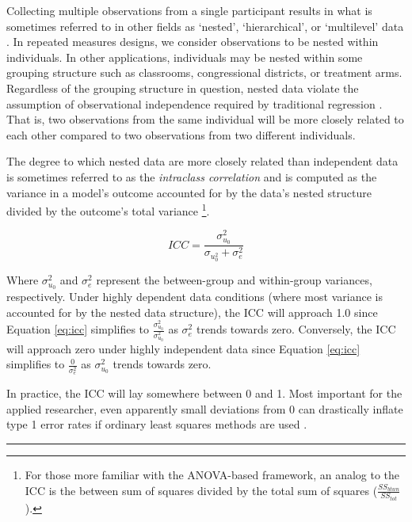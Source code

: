 \documentclass[
]{article}
\begin{document}
Collecting multiple observations from a single participant results in what is sometimes referred to in other fields as `nested', `hierarchical', or `multilevel' data \cite{aarts2014, boisgontier2016, raudenbush2002, schielzeth2013, zuur2009}. In repeated measures designs, we consider observations to be nested within individuals. In other applications, individuals may be nested within some grouping structure such as classrooms, congressional districts, or treatment arms. Regardless of the grouping structure in question, nested data violate the assumption of observational independence required by traditional regression \cite{dehart2019, hox2017, raudenbush2002}. That is, two observations from the same individual will be more closely related to each other compared to two observations from two different individuals.

The degree to which nested data are more closely related than independent data is sometimes referred to as the \emph{intraclass correlation} and is computed as the variance in a model's outcome accounted for by the data's nested structure divided by the outcome's total variance \cite[p.~15]{hox2017}\footnote{For those more familiar with the ANOVA-based framework, an analog to the ICC is the between sum of squares divided by the total sum of squares ($\frac{SS_{btwn}}{SS_{tot}}$).}.

\begin{equation}
ICC=\frac{\sigma_{u_{0}}^{2}}{\sigma_{u_{0}^{2}}+\sigma_{e}^{2}}
\label{eq:icc}
\end{equation}

\noindent
Where \(\sigma_{u_{0}}^{2}\) and \(\sigma_{e}^{2}\) represent the between-group and within-group variances, respectively. Under highly dependent data conditions (where most variance is accounted for by the nested data structure), the ICC will approach 1.0 since Equation \ref{eq:icc} simplifies to \(\frac{\sigma_{u_{0}}^{2}}{\sigma_{u_{0}}^{2}}\) as \(\sigma_{e}^{2}\) trends towards zero. Conversely, the ICC will approach zero under highly independent data since Equation \ref{eq:icc} simplifies to \(\frac{0}{\sigma_{e}^{2}}\) as \(\sigma_{u_{0}}^{2}\) trends towards zero.

In practice, the ICC will lay somewhere between 0 and 1. Most important for the applied researcher, even apparently small deviations from 0 can drastically inflate type 1 error rates if ordinary least squares methods are used \cite{musca2011}.

\begin{center}\rule{0.5\linewidth}{0.5pt}\end{center}
\end{document}
